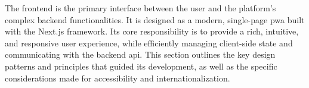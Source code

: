 The frontend is the primary interface between the user and the platform's complex backend functionalities. It is designed as a modern, single-page \ac{pwa} built with the Next.js framework. Its core responsibility is to provide a rich, intuitive, and responsive user experience, while efficiently managing client-side state and communicating with the backend \acs{api}. This section outlines the key design patterns and principles that guided its development, as well as the specific considerations made for accessibility and internationalization.